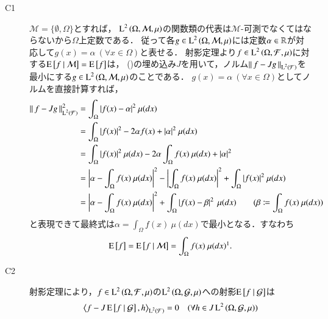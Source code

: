 	
	\begin{prf}\mbox{}
		\begin{description}
			\item[C1] $\mathcal{M} = \{\emptyset, \Omega\}$とすれば，
				$\operatorname{L}^{2} \left(\Omega, \mathcal{M},\mu\right)$の関数類の代表は$\mathcal{M}$-可測でなくてはならないから$\Omega$上定数である．
				従って各$g \in \operatorname{L}^{2} \left(\Omega, \mathcal{M},\mu\right)$には定数$\alpha \in \mathbb{R}$が対応して$g(x)=\alpha\ (\forall x \in \Omega)$と表せる．
				射影定理より$f \in \operatorname{L}^{2} \left(\Omega, \mathcal{F},\mu\right)$に対する$\operatorname{E} \left[ f \ \middle|\ \mathcal{M} \right] = \operatorname{E} \left[ f \right]$は，
				()の埋め込み$J$を用いて，ノルム$\left\|\, f-Jg\, \right\|_{\operatorname{L}^{2} \left(\mathcal{F}\right)}$を
				最小にする$g \in \operatorname{L}^{2} \left(\Omega, \mathcal{M},\mu\right)$のことである．
				$g(x)=\alpha\ (\forall x \in \Omega)$としてノルムを直接計算すれば，
				\begin{align}
					\left\|\, f-Jg\, \right\|_{\operatorname{L}^{2} \left(\mathcal{F}\right)}^2 &= \int_{\Omega} |f(x) - \alpha|^2\ \mu(dx) \\
					&= \int_{\Omega} |f(x)|^2 - 2 \alpha f(x) + |\alpha|^2\ \mu(dx) \\
					&= \int_{\Omega} |f(x)|^2\ \mu(dx) - 2 \alpha \int_{\Omega} f(x)\ \mu(dx) + |\alpha|^2 \\
					&= \left| \alpha - \int_{\Omega} f(x)\ \mu(dx) \right|^2 - \left| \int_{\Omega} f(x)\ \mu(dx) \right|^2 + \int_{\Omega} |f(x)|^2\ \mu(dx) \\
					&= \left| \alpha - \int_{\Omega} f(x)\ \mu(dx) \right|^2 + \int_{\Omega} \left| f(x) - \beta \right|^2\ \mu(dx) \qquad (\beta \coloneqq \int_{\Omega} f(x)\ \mu(dx))
				\end{align}
				と表現できて最終式は$\alpha = \int_{\Omega} f(x)\ \mu(dx)$で最小となる．すなわち
				\begin{align}
					\Exp{f} = \cexp{f}{\mathcal{M}} = \int_{\Omega} f(x)\ \mu(dx)\footnotemark
					.
				\end{align}
			\item[C2] 
				射影定理により，$f \in \operatorname{L}^{2} \left(\Omega, \mathcal{F},\mu\right)$の$\operatorname{L}^{2} \left(\Omega, \mathcal{G},\mu\right)$への射影$\operatorname{E} \left[ f \ \middle|\ \mathcal{G} \right]$は
				\begin{align}
					\inprod<f - J\cexp{f}{\mathcal{G}}, h>_{\Lp{2}{\mathcal{F}}} = 0 \quad (\forall h \in J\Lp{2}{\Omega, \mathcal{G},\mu})

\end{align}
\end{description}
\end{prf}
